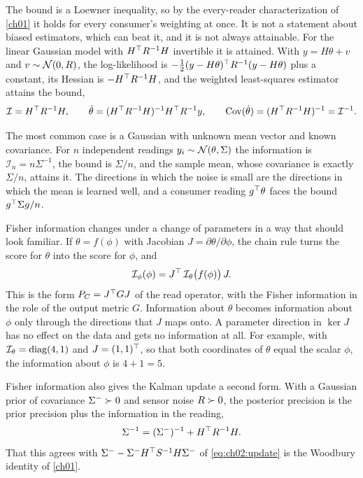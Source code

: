 The bound is a Loewner inequality, so by the every-reader characterization of
\cref{ch01} it holds for every consumer's weighting at once. It is not a
statement about biased estimators, which can beat it, and it is not always
attainable. For the linear Gaussian model with $H^{\top} R^{-1}H$ invertible it is
attained.
With $y=H\theta+v$ and $v\sim\mathcal{N}(0,R)$, the log-likelihood is
$-\tfrac12(y-H\theta)^{\top} R^{-1}(y-H\theta)$ plus a constant, its Hessian is
$-H^{\top} R^{-1}H$, and the weighted least-squares estimator attains the bound,
\begin{equation}\label{eq:ch02:lingauss}
\mathcal I=H^{\top} R^{-1}H,\qquad
\hat\theta=(H^{\top} R^{-1}H)^{-1}H^{\top} R^{-1}y,\qquad
\operatorname{Cov}(\hat\theta)=(H^{\top} R^{-1}H)^{-1}=\mathcal I^{-1}.
\end{equation}

The most common case is a Gaussian with unknown mean vector and known
covariance. For $n$ independent readings $y_i\sim\mathcal{N}(\theta,\Sigma)$ the
information is $\mathcal I_n=n\Sigma^{-1}$, the bound is $\Sigma/n$, and the
sample mean, whose covariance is exactly $\Sigma/n$, attains it. The directions
in which the noise is small are the directions in which the mean is learned
well, and a consumer reading $g^{\top}\theta$ faces the bound $g^{\top}\Sigma g/n$.

Fisher information changes under a change of parameters in a way that should
look familiar. If $\theta=f(\phi)$ with Jacobian $J=\partial\theta/\partial\phi$,
the chain rule turns the score for $\theta$ into the score for $\phi$, and
\begin{equation}\label{eq:ch02:fisherpull}
\mathcal I_\phi(\phi)=J^{\top}\,\mathcal I_\theta\big(f(\phi)\big)\,J .
\end{equation}
This is the form $P_C=J^{\top} GJ$ of the read operator, with the Fisher information
in the role of the output metric $G$. Information about $\theta$ becomes
information about $\phi$ only through the directions that $J$ maps onto. A
parameter direction in $\ker J$ has no effect on the data and gets no
information at all. For example, with $\mathcal I_\theta=\operatorname{diag}(4,1)$ and
$J=(1,1)^{\top}$, so that both coordinates of $\theta$ equal the scalar $\phi$, the
information about $\phi$ is $4+1=5$.

Fisher information also gives the Kalman update a second form. With a
Gaussian prior of covariance $\Sigma^-\succ0$ and sensor noise $R\succ0$, the
posterior precision is the prior precision plus the information in the reading,
\begin{equation}\label{eq:ch02:infoform}
\Sigma^{-1}=(\Sigma^-)^{-1}+H^{\top} R^{-1}H .
\end{equation}
That this agrees with $\Sigma^--\Sigma^-H^{\top} S^{-1}H\Sigma^-$ of
\cref{eq:ch02:update} is the Woodbury identity of \cref{ch01}.

